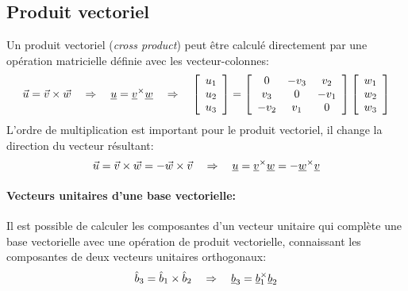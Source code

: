 \subsection{Produit vectoriel}
%
Un produit vectoriel (\textit{cross product}) peut être calculé directement par une opération matricielle définie avec les vecteur-colonnes:
\begin{equation}
 \vec{u} = \vec{v} \times \vec{w} \quad \Rightarrow \quad  \underline{u} = \underline{v}^{\times}\underline{w} \quad \Rightarrow \quad
 \left[ \begin{array}{c} u_1 \\ u_2 \\ u_3  \end{array} \right] =
 \left[ \begin{array}{c c c}
         0 & -v_3 & v_2  \\ v_3 & 0 & -v_1 \\ -v_2 & v_1 & 0
 \end{array}  \right]
 \left[ \begin{array}{c} w_1 \\ w_2 \\ w_3  \end{array} \right]
\end{equation}
L'ordre de multiplication est important pour le produit vectoriel, il change la direction du vecteur résultant:
\begin{equation}
 \vec{u} = \vec{v} \times \vec{w} =  -\vec{w} \times \vec{v} \quad \Rightarrow \quad  \underline{u} = \underline{v}^{\times}\underline{w} = - \underline{w}^{\times}\underline{v}
\end{equation}

\paragraph{Vecteurs unitaires d'une base vectorielle:}
Il est possible de calculer les composantes d'un vecteur unitaire qui complète une base vectorielle avec une opération de produit vectorielle, connaissant les composantes de deux vecteurs unitaires orthogonaux:
\begin{equation}
 \hat{b}_3 = \hat{b}_1 \times \hat{b}_2  \quad \Rightarrow \quad   \underline{b}_3 = \underline{b}_1^{\times}\underline{b}_2
\end{equation}

